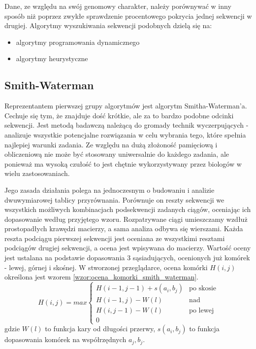 Dane, ze względu na swój genomowy charakter, należy porównywać w inny sposób niż poprzez zwykłe sprawdzenie procentowego pokrycia jednej sekwencji w drugiej.
Algorytmy wyszukiwania sekwencji podobnych dzielą się na:
\begin{itemize}
	\item algorytmy programowania dynamicznego
	\item algorytmy heurystyczne
\end{itemize}


\subsection*{Smith-Waterman}
Reprezentantem pierwszej grupy algorytmów jest algorytm Smitha-Waterman'a.
Cechuje się tym, że znajduje dość krótkie, ale za to bardzo podobne odcinki sekwencji.
Jest metodą badawczą należącą do gromady technik wyczerpujących - analizuje wszystkie potencjalne rozwiązania w celu wybrania tego, które spełnia najlepiej warunki zadania.
Ze względu na dużą złożoność pamięciową i obliczeniową nie może być stosowany uniwersalnie do każdego zadania, ale ponieważ ma wysoką czułość to jest chętnie wykorzystywany przez biologów w wielu zastosowaniach.

Jego zasada działania polega na jednoczesnym o budowaniu i analizie dwuwymiarowej tablicy przyrównania. Porównuje on reszty sekwencji we wszystkich możliwych kombinacjach podsekwencji zadanych ciągów, oceniając ich dopasowanie według przyjętego wzoru.
Rozpatrywane ciągi umieszczamy wzdłuż prostopadłych krawędzi macierzy, a sama analiza odbywa się wierszami.
Każda reszta podciągu pierwszej sekwencji jest oceniana ze wszystkimi resztami podciągów drugiej sekwencji, a ocena jest wpisywana do macierzy.
Wartość oceny jest ustalana na podstawie dopasowania 3 sąsiadujących, ocenionych już komórek - lewej, górnej i skośnej.
W stworzonej przeglądarce, ocena komórki $H(i,j)$ określona jest wzorem \ref{wzor:ocena_komorki_smith_waterman}.
\begin{equation}
\label{wzor:ocena_komorki_smith_waterman}
H(i,j) = max \left\{ 
	\begin{array}{ll}
		H(i-1,j-1) + s(a_i, b_j) & \textrm{po skosie}\\
		H(i-1,j) - W(l) & \textrm{nad}\\
		H(i, j-1) -W(l)& \textrm{po lewej}\\
		0 &
	\end{array}
	\right.
\end{equation}
gdzie $W(l)$ to funkcja kary od długości przerwy, $s(a_i, b_j)$ to funkcja dopasowania komórek na współrzędnych $a_j, b_j$.

